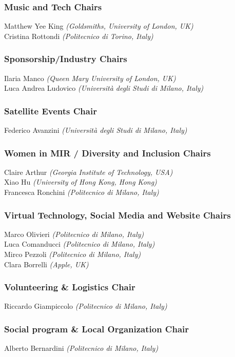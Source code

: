 \subsubsection*{Music and Tech Chairs}
Matthew Yee King \emph{(Goldsmiths, University of London, UK)}\\
Cristina Rottondi \emph{(Politecnico di Torino, Italy)}

\subsubsection*{Sponsorship/Industry Chairs}
Ilaria Manco \emph{(Queen Mary University of London, UK)}\\
Luca Andrea Ludovico \emph{(Università degli Studi di Milano, Italy)}

\subsubsection*{Satellite Events Chair}
Federico Avanzini \emph{(Università degli Studi di Milano, Italy)}

\subsubsection*{Women in MIR / Diversity and Inclusion Chairs}
Claire Arthur \emph{(Georgia Institute of Technology, USA)}\\
Xiao Hu \emph{(University of Hong Kong, Hong Kong)}\\
Francesca Ronchini \emph{(Politecnico di Milano, Italy)}

\subsubsection*{Virtual Technology, Social Media and Website Chairs}
Marco Olivieri \emph{(Politecnico di Milano, Italy)}\\
Luca Comanducci \emph{(Politecnico di Milano, Italy)}\\
Mirco Pezzoli \emph{(Politecnico di Milano, Italy)}\\
Clara Borrelli \emph{(Apple, UK)}

\subsubsection*{Volunteering \& Logistics Chair}
Riccardo Giampiccolo \emph{(Politecnico di Milano, Italy)}

\subsubsection*{Social program \& Local Organization Chair}
Alberto Bernardini \emph{(Politecnico di Milano, Italy)}

